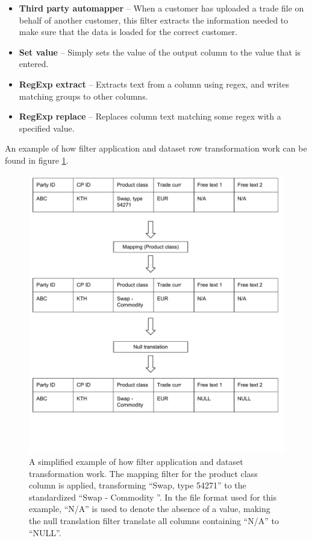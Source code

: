 \begin{itemize}
\item \textbf{Third party automapper} --
When a customer has uploaded a trade file on behalf of another customer, this filter extracts the information needed to make sure that the data is loaded
for the correct customer.

\item \textbf{Set value} --
Simply sets the value of the output column to the value that is entered.

\item \textbf{RegExp extract} --
Extracts text from a column using regex, and writes matching groups to other columns.

\item \textbf{RegExp replace} --
Replaces column text matching some regex with a specified value.

\end{itemize}

An example of how filter application and dataset row transformation work can be found in figure \ref{fig:filter_diagram}.

\begin{figure}[ht]
  \centering
  \includegraphics[width=120mm]{figures/filter_diagram.pdf}
  \caption[Filter application example.]{A simplified example of how filter application and dataset transformation work. The mapping filter for the
  product class column is applied, transforming ``Swap, type 54271'' to the standardized ``Swap - Commodity ''. In the file format used for this example,
  ``N/A'' is used to denote the absence of a value, making the null translation filter translate all columns containing ``N/A'' to ``NULL''.}
  \label{fig:filter_diagram}
\end{figure}

